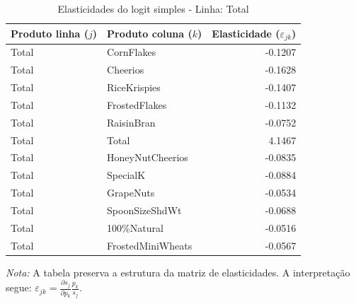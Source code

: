 \begingroup
\begin{table}[H]
\centering
\caption{Elasticidades do logit simples - Linha: Total}
\label{tab:elas-total}
\small
\begin{tabular}{llr}
\toprule
Produto linha ($j$) & Produto coluna ($k$) & Elasticidade ($\varepsilon_{jk}$) \\
\midrule
Total & CornFlakes & -0.1207 \\
Total & Cheerios & -0.1628 \\
Total & RiceKrispies & -0.1407 \\
Total & FrostedFlakes & -0.1132 \\
Total & RaisinBran & -0.0752 \\
Total & Total & 4.1467 \\
Total & HoneyNutCheerios & -0.0835 \\
Total & SpecialK & -0.0884 \\
Total & GrapeNuts & -0.0534 \\
Total & SpoonSizeShdWt & -0.0688 \\
Total & 100\%Natural & -0.0516 \\
Total & FrostedMiniWheats & -0.0567 \\
\bottomrule
\end{tabular}

\vspace{0.3em}
\footnotesize
\textit{Nota:} A tabela preserva a estrutura da matriz de elasticidades. A interpretação segue: $\varepsilon_{jk}=\frac{\partial s_j}{\partial p_k}\frac{p_k}{s_j}$.
\end{table}
\endgroup


